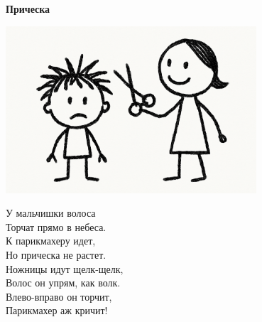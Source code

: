\vspace*{\fill}
\begin{center}
  {\huge\textbf{Прическа}}

  \vspace{1.5em}  \includegraphics[width=0.7\textwidth]{pictures/haircut.png}
  \vspace{4em}
  \parbox{0.6\textwidth}{
    \LARGE
    \begin{spacing}{1.2}
      У мальчишки волоса\\
      Торчат прямо в небеса.\\
      К парикмахеру идет,\\
      Но прическа не растет.\\

      Ножницы идут щелк-щелк,\\
      Волос он упрям, как волк.\\
      Влево-вправо он торчит,\\
      Парикмахер аж кричит! %
    \end{spacing}
      
  }
\end{center}
\vspace*{\fill}